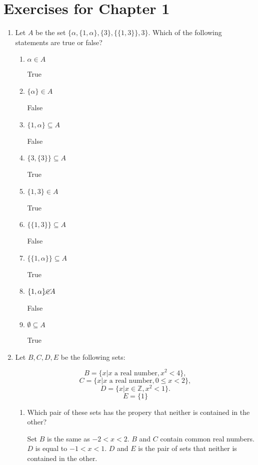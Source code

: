 \documentclass{article}
\begin{document}
	\section*{Exercises for Chapter 1}
	
	\begin{enumerate}
		\item Let $A$ be the set $\{ \alpha , \{ 1, \alpha \}, \{ 3 \}, \{\{ 1, 3 \} \}, 3 \}$. Which of the following
		statements are true or false?
		
		\begin{enumerate}
			\item $\alpha \in A$
			
				True
				
			\item $\{ \alpha \} \in A$
			
				False
				
			\item $\{ 1, \alpha \} \subseteq A$ 
			
				False
				
			\item $\{ 3, \{3\} \} \subseteq A$
			
				True
				
			\item $\{ 1, 3 \} \in A$
			
				True
				
			\item $\{\{1, 3\} \} \subseteq A$
			
				False
				
			\item $\{\{1, \alpha \}\} \subseteq A$
			
				True
				
			\item $\{1, \alpha \} \cancel{ \in } A$
			
				False
				
			\item $\emptyset \subseteq A$
			
				True
		\end{enumerate}
		
		\item Let $B, C, D, E$ be the following sets:
		
			$$B  = \{x | x \text{ a real number}, x^2 < 4 \} ,$$
			$$C = \{x | x \text{ a real number}, 0 \leq x < 2 \},$$
			$$D = \{x | x \in \mathbb{Z}, x^2 < 1 \}. $$
			$$E = \{ 1 \}$$
			
		\begin{enumerate}
		
			\item Which pair of these sets has the propery that neither is contained in the other?
			
				Set $B$ is the same as $-2 < x < 2$. $B$ and $C$ contain common real numbers. 
				$D$ is equal to $-1 < x < 1$. $D$ and $E$ is the pair of sets that neither is contained
				in the other.
		\end{enumerate}
	\end{enumerate}
\end{document}

